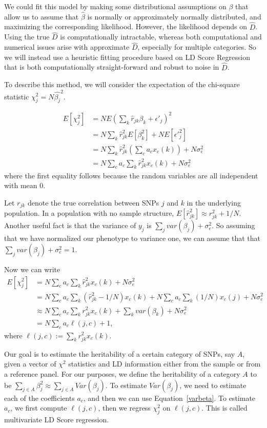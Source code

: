 \documentclass[11pt]{article}
\begin{document}
We could fit this model by making some distributional assumptions on $\beta$ that allow us to assume that $\hat{\beta}$ is normally or approximately normally distributed, and maximizing the corresponding likelihood. However, the likelihood depends on $\hat{D}$. Using the true $\hat{D}$ is computationally intractable, whereas both computational and numerical issues arise with approximate $\hat{D}$, especially for multiple categories. So we will instead use a heuristic fitting procedure based on LD Score Regression \cite{} that is both computationally straight-forward and robust to noise in $\hat{D}$.

To describe this method, we will consider the expectation of the chi-square statistic $\chi^2_j = N \hat{\beta_j}^2$. 

\begin{align*}
E[\chi^2_j] &= N E\left(\sum_k \hat{r}_{jk} \beta_k + \epsilon'_j\right)^2\\
&= N\sum_k \hat{r}_{jk}^2 E[\beta_k ^2] + NE[{\epsilon'}_j^2]\\
&= N\sum_k \hat{r}_{jk}^2 \left(\sum_c a_c x_c(k)\right) + N \sigma^2_e\\
&= N \sum_c a_c \sum_k \hat{r}_{jk}^2 x_c(k) + N \sigma^2_e
\end{align*}
where the first equality follows because the random variables are all independent with mean 0.

Let $r_{jk}$ denote the true correlation between SNPs $j$ and $k$ in the underlying population. In a population with no sample structure, $E[\hat{r}_{jk}^2] \approx r_{jk}^2 + 1/N$. Another useful fact is that the variance of $y_j$ is $\sum_j var(\beta_j) + \sigma^2_e$. So assuming that we have normalized our phenotype to variance one, we can assume that that $\sum_j var(\beta_j) + \sigma^2_e = 1$.

Now we can write
\begin{align*}
E[\chi^2_j] &= N \sum_c a_c \sum_k \hat{r}_{jk}^2 x_c(k) + N \sigma^2_e\\
&= N \sum_c a_c \sum_k (\hat{r}_{jk}^2 - 1/N) x_c(k) + N \sum_c a_c \sum_k (1/N) x_c(j) + N \sigma^2_e\\
&\approx N \sum_c a_c \sum_k r_{jk}^2 x_c(k) + \sum_k var(\beta_k) + N \sigma^2_e\\
&= N \sum_c a_c \ell(j,c) + 1,
\end{align*}
where $\ell(j,c) := \sum_k r_{jk}^2 x_c(k)$.

Our goal is to estimate the heritability of a certain category of SNPs, say $A$, given a vector of $\chi^2$ statistics and LD information either from the sample or from a reference panel. For our purposes, we define the heritability of a category $A$ to be $\sum_{j \in A} \beta_j^2 \approx \sum_{j \in A} Var(\beta_j).$ To estimate $Var(\beta_j)$, we need to estimate each of the coefficients $a_c$, and then we can use Equation~\eqref{varbeta}. To estimate $a_c$, we first compute $\ell(j,c)$, then we regress $\chi^2_j$ on $\ell(j,c)$. This is called multivariate LD Score regression.
\end{document}
